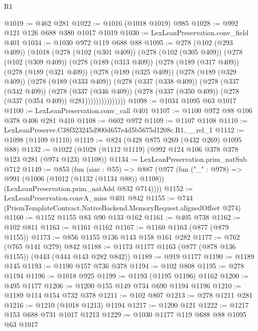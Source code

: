 \begin{lexlean}{R1}
\begin{coremodule}
@1019 := @462 @281
@1022 := @1016 (@1018 @1019) @985
@1028 := @992 @121 @126 @688 @380 @1017 @1019
@1030 := LexLeanPreservation.conv_field @401
@1034 := @1030 @972 @119 @688 @88
@1095 := @278
    (@102 (@293 @409))
    (@1018
      (@278
        (@102 (@301 @409))
        (@278
          (@102 (@305 @409))
          (@278
            (@102 (@309 @409))
            (@278
              (@189 (@313 @409))
              (@278
                (@189 (@317 @409))
                (@278
                  (@189 (@321 @409))
                  (@278
                    (@189 (@325 @409))
                    (@278
                      (@189 (@329 @409))
                      (@278
                        (@189 (@333 @409))
                        (@278
                          (@337 (@338 @409))
                          (@278
                            (@337 (@342 @409))
                            (@278
                              (@337 (@346 @409))
                              (@278 (@337 (@350 @409)) (@278 (@337 (@354 @409)) @281)))))))))))))))
@1098 := @1034 @1095 @63 @1017
@1100 := LexLeanPreservation.conv_call @401
@1107 := @1100 @972 @88 @106 @378 @406 @281 @410
@1108 := @602 @972
@1109 := @1107 @1108
@1110 := LexLeanPreserve.C38f323245d900d657e4d5b5675d1208c.R1.__rel_1
@1112 := @1098 (@1109 @1110)
@1119 := @824 (@428 @875 @269 (@432 @269) @1095 @88)
@1132 := @1022 (@1028 (@1112 @1119) (@992 @124 @106 @378 @378 @123 @281 (@974 @123) @1108))
@1134 := LexLeanPreservation.prim_natSub @712
@1149 := @853
    (fun (size : @55) =>
    @887
      (@977
        (fun ("_" : @978) =>
        @991
          (@1006 (@1012 (@1132 (@1134 @88)) @1108))
          (LexLeanPreservation.prim_natAdd @832 @714))))
@1152 := LexLeanPreservation.convA_miss @401 @842
@1155 := @744 (PrismTemplateContract.NativeBackend.MemoryRequest.alignedOffset @274)
@1160 := @1152 @1155 @83 @90 @133 @162
@1161 := @405 @738
@1162 := @102 @811
@1163 := @1161 @1162
@1167 := @1160 @1163 (@877 (@879 @1155))
@1173 := @856 @1155 @136 @143 @158 @161 @282
@1177 := @762 (@765 @141 @279) @842
@1188 := @1173 @1177 @1163 (@877 (@878 @136 @1155)) (@443 (@444 @143 @282 @842))
@1189 := @919 @1177
@1190 := @1189 @145
@1193 := @1190 @157 @736 @378
@1194 := @102 @808
@1195 := @278 @1194
@1196 := @1018 @925
@1199 := @1193 (@1195 @1196) @1162
@1200 := @495 @1177
@1206 := @1200 @155 @149 @734 @690 @1194 @1196
@1210 := @1189 @114 @154 @732 @378
@1211 := @102 @807
@1213 := @278 @1211 @281
@1216 := @1210 (@1018 @1213) @1194
@1217 := @1200 @121
@1222 := @1217 @153 @688 @731 @1017 @1213
@1229 := @1030 @1177 @119 @688 @88 @1095 @63 @1017

\end{coremodule}
\end{lexlean}
